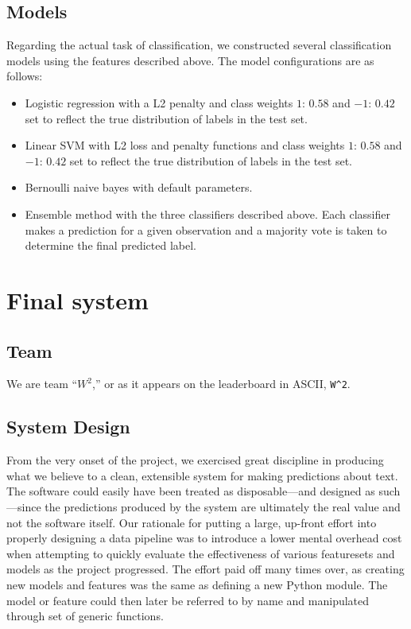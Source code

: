 \documentclass[
10pt, %
a4paper, %
oneside, %
headinclude,footinclude, %
BCOR5mm, %
]{scrartcl}
\begin{document}

\subsection{Models}
Regarding the actual task of classification, we constructed several 
classification models using the features described above. The model 
configurations are as follows:

\begin{itemize}
	\item Logistic regression with a L2 penalty and class weights $1$: $0.58$ and
	$-1$: $0.42$ set to reflect the true distribution of labels in the test set.

	\item Linear SVM with L2 loss and penalty functions and class 
	weights $1$: $0.58$ and $-1$: $0.42$ set to reflect the true distribution of
	labels in the test set.

	\item Bernoulli naive bayes with default parameters.

	\item Ensemble method with the three classifiers described above. Each 
	classifier makes a prediction for a given observation and a majority vote is
	taken to determine the final predicted label.
\end{itemize}


\section{Final system}

\subsection{Team}

We are team ``$W^2$,'' or as it appears on the leaderboard in ASCII,
\texttt{W\string^2}.

\subsection{System Design}

From the very onset of the project, we exercised great discipline in producing
what we believe to a clean, extensible system for making predictions about text.
The software could easily have been treated as disposable---and designed as such
---since the predictions produced by the system are ultimately the real value
and not the software itself. Our rationale for putting a large, up-front effort
into properly designing a data pipeline was to introduce a lower mental overhead
cost when attempting to quickly evaluate the effectiveness of various
featuresets and models as the project progressed. The effort paid off many times
over, as creating new models and features was the same as defining a new Python
module. The model or feature could then later be referred to by name and
manipulated through set of generic functions.
\end{document}
